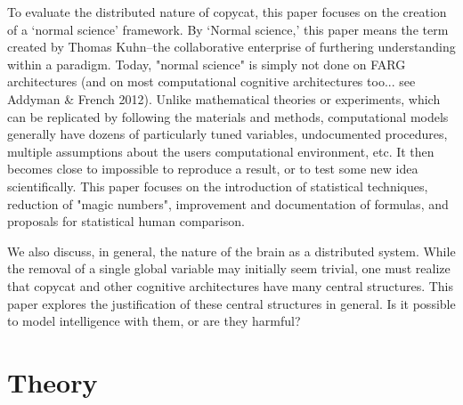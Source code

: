 \documentclass[a4paper]{article}
\begin{document}
    To evaluate the distributed nature of copycat, this paper focuses on the creation of a `normal science' framework.
    By `Normal science,' this paper means the term created by Thomas Kuhn--the collaborative enterprise of furthering understanding within a paradigm. 
    Today, "normal science" is simply not done on FARG architectures (and on most computational cognitive architectures too... see Addyman \& French 2012). 
    Unlike mathematical theories or experiments, which can be replicated by following the materials and methods, computational models generally have dozens of particularly tuned variables, undocumented procedures, multiple assumptions about the users computational environment, etc.
    It then becomes close to impossible to reproduce a result, or to test some new idea scientifically. 
    This paper focuses on the introduction of statistical techniques, reduction of "magic numbers", improvement and documentation of formulas, and proposals for statistical human comparison.

    We also discuss, in general, the nature of the brain as a distributed system.
    While the removal of a single global variable may initially seem trivial, one must realize that copycat and other cognitive architectures have many central structures.
    This paper explores the justification of these central structures in general.
    Is it possible to model intelligence with them, or are they harmful?

\section{Theory}
\end{document}
